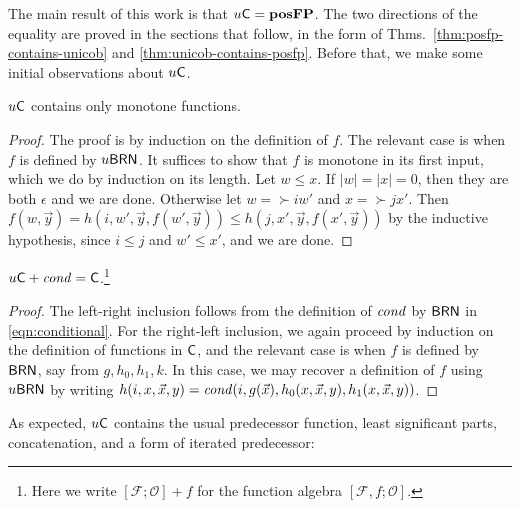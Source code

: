 \documentclass{lmcs}
\begin{document}
The main result of this work is 
that $u \mathsf{C} = \mathbf{pos}\mathbf{FP}$.
The two directions of the equality are proved in the sections that follow, in the form of Thms.~\ref{thm:posfp-contains-unicob} and \ref{thm:unicob-contains-posfp}.
Before that, we make some initial observations about $u \mathsf{C}$.
\begin{proposition}
	$u \mathsf{C}$ contains only monotone functions.
\end{proposition}
\begin{proof}
	The proof is by induction on the definition of $f$. 
	The relevant case is when $f$ is defined by $u\mathsf{BRN}$. 
	It suffices to show that $f$ is monotone in its first input, which we do by induction on its length. Let $w \leq x$. If $|w| = |x| = 0$, then they are both $\epsilon$ and we are done. Otherwise let $w = \succ i w'$ and $x = \succ j x'$.
	Then $f(w , \vec y ) = h( i , w' , \vec y , f(w' , \vec y) ) \leq h(j , x' , \vec y , f(x' , \vec y))$ by the inductive hypothesis, since $i\leq j$ and $w' \leq x'$, and we are done. 
\end{proof}

\begin{proposition}
	$u \mathsf{C} +\mathit{cond} = \mathsf{C}$.\footnote{Here we write $[\mathcal F; \mathcal O] + f$ for the function algebra $[\mathcal F,f;\mathcal O]$.}
\end{proposition}
\begin{proof}
	The left-right inclusion follows from the definition of $\mathit{cond}$ by $\mathsf{BRN}$ in \eqref{eqn:conditional}. For the right-left inclusion, we again proceed by induction on the definition of functions in $\mathsf{C}$, and the relevant case is when $f$ is defined by $\mathsf{BRN}$, say from $g,h_0 ,h_1 ,k$. 
	In this case, we may recover a definition of $f$ using $u\mathsf{BRN}$ by writing $h(i , x , \vec x , y) = \mathit{cond} (i, g(\vec x), h_0 (x, \vec x , y), h_1 (x, \vec x , y ))$.
\end{proof}

As expected, 
$u \mathsf{C}$ contains the usual predecessor function, least significant parts, concatenation, and a form of iterated predecessor:
\end{document}
